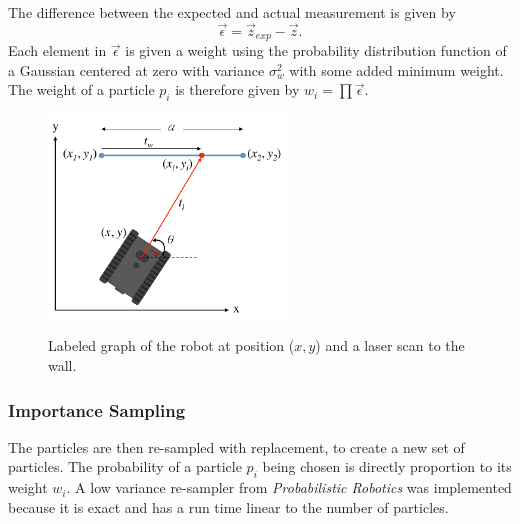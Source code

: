 \documentclass[conference]{../IEEEtran}
\begin{document}
The difference between the expected and actual measurement is given by
\begin{equation}
  \vec{\epsilon} = \vec{z}_{exp} - \vec{z}.
\end{equation}
Each element in $\vec{\epsilon}$ is given a weight using the probability distribution
function of a Gaussian centered at zero with variance $\sigma^2_w$ with some added minimum
weight. The weight of a particle $p_i$ is therefore given by $w_i = \prod \vec{\epsilon}$.

\begin{figure}[t]
  \centering
  \includegraphics[width=2.5in]{figures/Untitled.pdf}
  \label{fig:wallSeg}
  \caption{Labeled graph of the robot at position ($x,y$) and a laser
           scan to the wall.}
\end{figure}

\subsubsection{Importance Sampling}

The particles are then re-sampled with replacement, to create a new set of particles. The
probability of a particle $p_i$ being chosen is directly proportion to its weight $w_i$. A
low variance re-sampler from \textit{Probabilistic Robotics} was implemented because it is
exact and has a run time linear to the number of particles.
\end{document}
